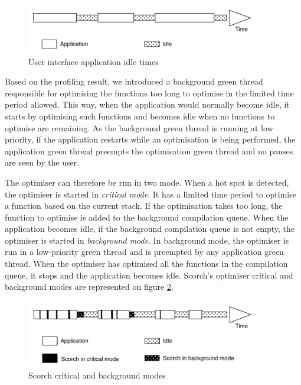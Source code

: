 \documentclass[a4paper,12pt,twoside]{../includes/ThesisStyle}
\begin{document}
\begin{figure}[h!]
    \begin{center}
        \includegraphics[width=0.95\linewidth]{ApplicationIdle}
        \caption{User interface application idle times}
        \label{fig:ApplicationIdle}
    \end{center}
\end{figure}

Based on the profiling result, we introduced a background green thread responsible for optimising the functions too long to optimise in the limited time period allowed. This way, when the application would normally become idle, it starts by optimising such functions and becomes idle when no functions to optimise are remaining. As the background green thread is running at low priority, if the application restarts while an optimisation is being performed, the application green thread preempts the optimisation green thread and no pauses are seen by the user.

The optimiser can therefore be run in two mode. When a hot spot is detected, the optimiser is started in \emph{critical mode}. It has a limited time period to optimise a function based on the current stack. If the optimisation takes too long, the function to optimise is added to the background compilation queue. When the application becomes idle, if the background compilation queue is not empty, the optimiser is started in \emph{background mode}. In background mode, the optimiser is run in a low-priority green thread and is preempted by any application green thread. When the optimiser has optimised all the functions in the compilation queue, it stops and the application becomes idle. Scorch's optimiser critical and background modes are represented on figure \ref{fig:ScorchModes}.

\begin{figure}[h!]
    \begin{center}
        \includegraphics[width=0.95\linewidth]{ScorchModes}
        \caption{Scorch critical and background modes}
        \label{fig:ScorchModes}
    \end{center}
\end{figure}
\end{document}

